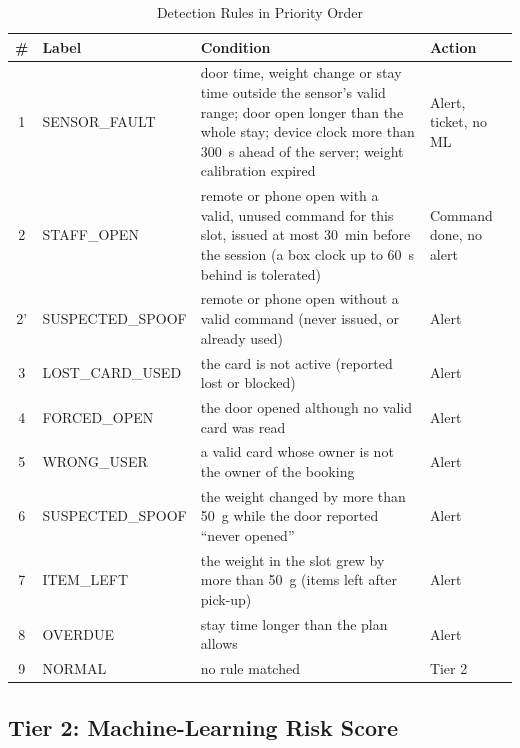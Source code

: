 \begin{table}[!htbp]
\renewcommand{\arraystretch}{1.1}
\centering
\small
\caption{Detection Rules in Priority Order}
\label{tab:rules}
\begin{tabular}{c l p{8.4cm} l}
\hline
\# & Label & Condition & Action \\
\hline
1 & SENSOR\_FAULT & door time, weight change or stay time outside the sensor's valid range; door open longer than the whole stay; device clock more than 300~s ahead of the server; weight calibration expired & Alert, ticket, no ML \\
2 & STAFF\_OPEN & remote or phone open with a valid, unused command for this slot, issued at most 30~min before the session (a box clock up to 60~s behind is tolerated) & Command done, no alert \\
2' & SUSPECTED\_SPOOF & remote or phone open without a valid command (never issued, or already used) & Alert \\
3 & LOST\_CARD\_USED & the card is not active (reported lost or blocked) & Alert \\
4 & FORCED\_OPEN & the door opened although no valid card was read & Alert \\
5 & WRONG\_USER & a valid card whose owner is not the owner of the booking & Alert \\
6 & SUSPECTED\_SPOOF & the weight changed by more than 50~g while the door reported ``never opened'' & Alert \\
7 & ITEM\_LEFT & the weight in the slot grew by more than 50~g (items left after pick-up) & Alert \\
8 & OVERDUE & stay time longer than the plan allows & Alert \\
9 & NORMAL & no rule matched & Tier 2 \\
\hline
\end{tabular}
\end{table}

\subsection{Tier 2: Machine-Learning Risk Score}

